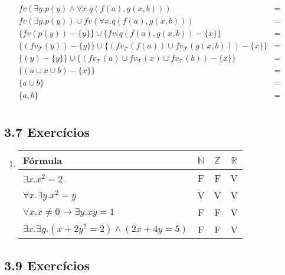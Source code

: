 \begin{enumerate}
\begin{enumerate}
			\[
			  \begin{array}{lcl}
				   	  fv(\exists y. p(y) \land \forall x. q(f(a),g(x,b))) & = & \\
					  fv(\exists y. p(y)) \cup fv(\forall x. q(f(a),g(x,b))) & = & \\
					  \{fv(p(y)) - \{y\}\} \cup \{fv(q(f(a),g(x,b)) - \{x\}\} & = & \\
					  \{(fv_{\mathcal{T}}(y)) - \{y\}\} \cup \{(fv_{\mathcal{T}}(f(a))\cup fv_{\mathcal{T}}(g(x,b))) - \{x\}\} & = & \\
					  \{(y) - \{y\}\} \cup \{(fv_{\mathcal{T}}(a)\cup fv_{\mathcal{T}}(x) \cup fv_{\mathcal{T}}(b)) - \{x\}\} & = & \\
					  \{( a \cup x \cup b) - \{x\}\} & = & \\
					   \{ a \cup b \} & = & \\
					  \{ a, b \} & = & \\
			  \end{array}
			\]
		\end{enumerate}
	\end{enumerate}
	
\subsection{3.7 Exerc\'icios}

	\begin{enumerate}
		\item
		\begin{center}
	    \begin{tabular}{|l|c|c|c|}
	        \hline
	        F\'ormula & $\mathbb{N}$ & $\mathbb{Z}$ & $\mathbb{R}$ \\ \hline
	        $\exists x. x^2 = 2$ & F & F & V\\ \hline
	        $\forall x. \exists y. x^2 = y$ & V & V & V \\ \hline
	        $\forall x. x\neq 0 \rightarrow \exists y. xy = 1$ & F & F & V \\ \hline
	        $\exists x. \exists y. (x + 2y^2 = 2) \land (2x + 4y = 5)$ & F & F & V \\
	        \hline
	    \end{tabular}
	    \end{center} 
	\end{enumerate}
	
\subsection{3.9 Exerc\'icios}

